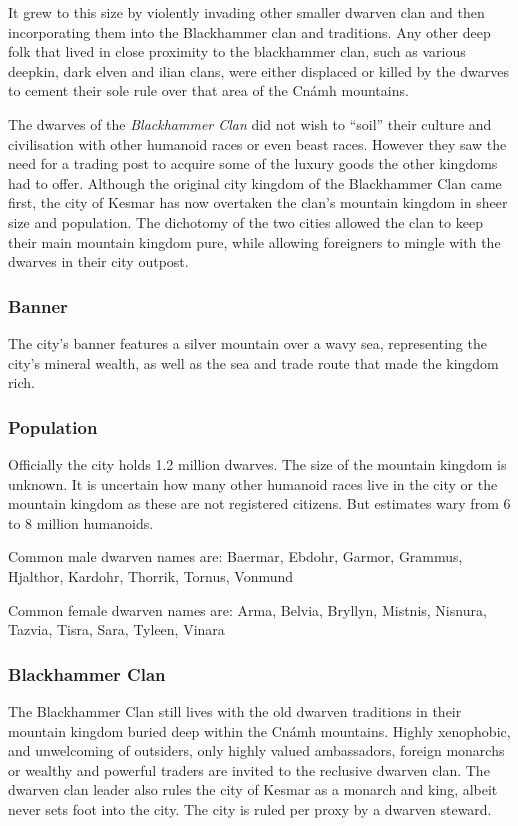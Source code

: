 It grew to this size by violently invading other smaller dwarven clan and then
incorporating them into the Blackhammer clan and traditions. Any other deep
folk that lived in close proximity to the blackhammer clan, such as various
deepkin, dark elven and ilian clans, were either displaced or killed by the
dwarves to cement their sole rule over that area of the Cnámh mountains.

The dwarves of the \emph{Blackhammer Clan} did not wish to ``soil'' their
culture and civilisation with other humanoid races or even beast
races. However they saw the need for a trading post to acquire some of the
luxury goods the other kingdoms had to offer. Although the original city
kingdom of the Blackhammer Clan came first, the city of Kesmar has now
overtaken the clan's mountain kingdom in sheer size and population. The
dichotomy of the two cities allowed the clan to keep their main mountain
kingdom pure, while allowing foreigners to mingle with the dwarves in their
city outpost.

\subsubsection{Banner}

The city's banner features a silver mountain over a wavy sea, representing the
city's mineral wealth, as well as the sea and trade route that made the
kingdom rich.

\subsubsection{Population}

Officially the city holds 1.2 million dwarves. The size of the mountain
kingdom is unknown. It is uncertain how many other humanoid races live in
the city or the mountain kingdom as these are not registered citizens. But
estimates wary from 6 to 8 million humanoids.

Common male dwarven names are: Baermar, Ebdohr, Garmor, Grammus, Hjalthor,
Kardohr, Thorrik, Tornus, Vonmund

Common female dwarven names are: Arma, Belvia, Bryllyn, Mistnis, Nisnura, Tazvia,
Tisra, Sara, Tyleen, Vinara

\subsubsection{Blackhammer Clan}
\label{sec:Blackhammer Clan}

The Blackhammer Clan still lives with the old dwarven traditions in their
mountain kingdom buried deep within the Cnámh mountains. Highly xenophobic,
and unwelcoming of outsiders, only highly valued ambassadors, foreign monarchs
or wealthy and powerful traders are invited to the reclusive dwarven clan. The
dwarven clan leader also rules the city of Kesmar as a monarch and king,
albeit never sets foot into the city. The city is ruled per proxy by a dwarven
steward.

